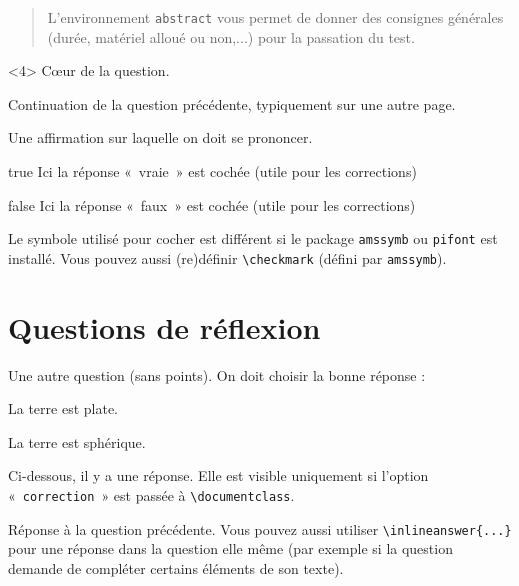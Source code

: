 \documentclass[12pt,a4paper, rulers]{tests}
\begin{document}
\begin{abstract}
  L'environnement \verb+abstract+ vous permet de donner des
  consignes générales (durée, matériel alloué ou non,...) pour la
  passation du test.
\end{abstract}


\begin{question}<4>
  Cœur de la question.
\end{question}

\begin{question*}
  Continuation de la question précédente, typiquement sur une autre
  page.
\end{question*}


\begin{question}
  \begin{TrueFalse}
  \item Une affirmation sur laquelle on doit se prononcer.
  \item[true] Ici la réponse «~vraie~» est cochée (utile pour les
    corrections)
  \item[false] Ici la réponse «~faux~» est cochée (utile pour les
    corrections)
  \end{TrueFalse}
  Le symbole utilisé pour cocher est différent si le package
  \verb+amssymb+ ou \verb+pifont+ est installé.  Vous pouvez aussi
  (re)définir \verb+\checkmark+ (défini par \verb+amssymb+).
\end{question}

\newpage

\part{Questions de réflexion}

\begin{question}
  Une autre question (sans points).  On doit choisir la bonne réponse :
  \begin{TrueFalse*}
  \item La terre est plate.
  \item La terre est sphérique.
  \end{TrueFalse*}
\end{question}

Ci-dessous, il y a une réponse.  Elle est visible uniquement si
l'option «~\verb+correction+~» est passée à \verb+\documentclass+.
\begin{answer}
  Réponse à la question précédente.  Vous pouvez aussi utiliser
  \verb+\inlineanswer{...}+ pour une réponse dans la question elle
  même (par exemple si la question demande de compléter certains
  éléments de son texte).
\end{answer}
\end{document}
